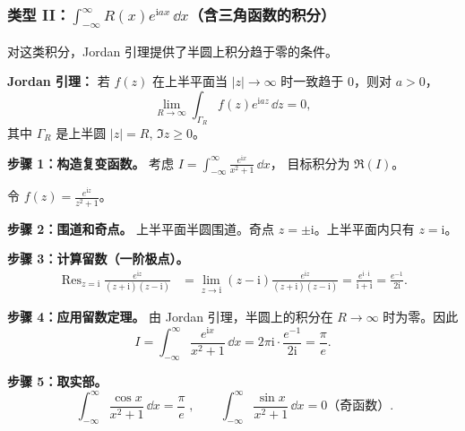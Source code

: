 \subsubsection{\texorpdfstring{类型 II：$\int_{-\infty}^{\infty} R(x) e^{\mathrm{i}ax}\,\dd x$（含三角函数的积分）}{类型 II：∫R(x)e^{iax}dx（含三角函数的积分）}}

对这类积分，Jordan 引理提供了半圆上积分趋于零的条件。

\textbf{Jordan 引理：} 若 $f(z)$ 在上半平面当 $|z|\to\infty$ 时一致趋于 $0$，则对 $a>0$，
\begin{equation}
\lim_{R\to\infty}\int_{\Gamma_R} f(z) e^{\mathrm{i}az}\,\dd z = 0,
\end{equation}
其中 $\Gamma_R$ 是上半圆 $|z|=R$, $\Im z \geq 0$。

\begin{example}
\textbf{步骤 1：构造复变函数。}
考虑 $\displaystyle I = \int_{-\infty}^{\infty} \frac{e^{\mathrm{i}x}}{x^2+1}\,\dd x$，
目标积分为 $\Re(I)$。

令 $f(z) = \frac{e^{\mathrm{i}z}}{z^2+1}$。

\textbf{步骤 2：围道和奇点。}
上半平面半圆围道。奇点 $z=\pm\mathrm{i}$。上半平面内只有 $z=\mathrm{i}$。

\textbf{步骤 3：计算留数（一阶极点）。}
\begin{align*}
\mathop{\mathrm{Res}}_{z=\mathrm{i}} \frac{e^{\mathrm{i}z}}{(z+\mathrm{i})(z-\mathrm{i})}
&= \lim_{z\to\mathrm{i}} (z-\mathrm{i})\frac{e^{\mathrm{i}z}}{(z+\mathrm{i})(z-\mathrm{i})}
= \frac{e^{\mathrm{i}\cdot\mathrm{i}}}{\mathrm{i}+\mathrm{i}}
= \frac{e^{-1}}{2\mathrm{i}}.
\end{align*}

\textbf{步骤 4：应用留数定理。}
由 Jordan 引理，半圆上的积分在 $R\to\infty$ 时为零。因此
\begin{equation}
I = \int_{-\infty}^{\infty} \frac{e^{\mathrm{i}x}}{x^2+1}\,\dd x
= 2\pi\mathrm{i} \cdot \frac{e^{-1}}{2\mathrm{i}} = \frac{\pi}{e}.
\end{equation}

\textbf{步骤 5：取实部。}
\begin{equation}
\boxed{\;\int_{-\infty}^{\infty} \frac{\cos x}{x^2+1}\,\dd x = \frac{\pi}{e}\;},
\qquad
\int_{-\infty}^{\infty} \frac{\sin x}{x^2+1}\,\dd x = 0 \text{（奇函数）}.
\end{equation}
\end{example}

